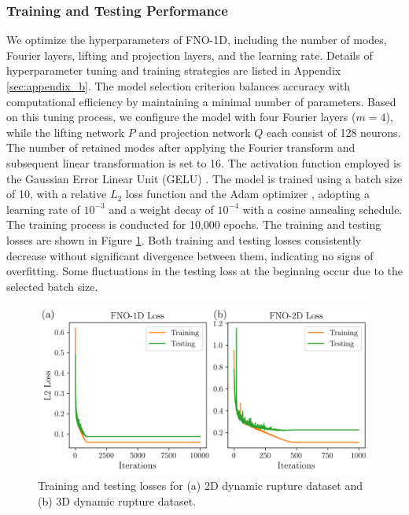 \documentclass[draft]{agujournal2019}
\begin{document}
\subsubsection{Training and Testing Performance}
\label{sec:FNO-1D_training}

We optimize the hyperparameters of FNO-1D, including the number of modes, Fourier layers, lifting and projection layers, and the learning rate. Details of hyperparameter tuning and training strategies are listed in Appendix \ref{sec:appendix_b}. The model selection criterion balances accuracy with computational efficiency by maintaining a minimal number of parameters. Based on this tuning process, we configure the model with four Fourier layers (\(m = 4\)), while the lifting network \(P\) and projection network \(Q\) each consist of 128 neurons. The number of retained modes after applying the Fourier transform and subsequent linear transformation is set to 16. The activation function employed is the Gaussian Error Linear Unit (GELU) \cite{hendrycks2016gaussian}. The model is trained using a batch size of 10, with a relative \(L_2\) loss function and the Adam optimizer \cite{kingma2014adam}, adopting a learning rate of \(10^{-3}\) and a weight decay of \(10^{-4}\) with a cosine annealing schedule. The training process is conducted for 10,000 epochs. The training and testing losses are shown in Figure \ref{fig:loss}. Both training and testing losses consistently decrease without significant divergence between them, indicating no signs of overfitting. Some fluctuations in the testing loss at the beginning occur due to the selected batch size.

\begin{figure}
\centering
\includegraphics[width=0.7\linewidth]{loss2.png}
\caption{\label{fig:loss}Training and testing losses for (a) 2D dynamic rupture dataset and (b) 3D dynamic rupture dataset.
}
\end{figure}
\end{document}
